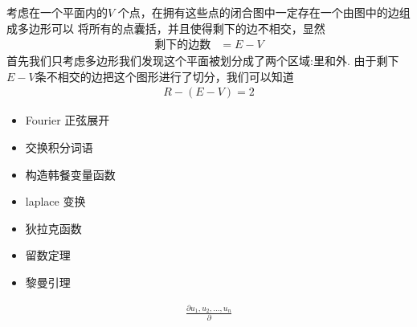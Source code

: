 \begin{thm}
考虑在一个平面内的$ V $ 个点，在拥有这些点的闭合图中一定存在一个由图中的边组成多边形可以
将所有的点囊括，并且使得剩下的边不相交，显然
\begin{align*}
		\text{剩下的边数}&= E-V 
\end{align*}
首先我们只考虑多边形我们发现这个平面被划分成了两个区域:里和外.
由于剩下$ E-V $条不相交的边把这个图形进行了切分，我们可以知道
 \begin{align*}
		R-(E-V) = 2
\end{align*}
\end{thm}
\begin{thm}[关于积分的菜谱]
		\begin{itemize}
				\item Fourier 正弦展开
				\item 交换积分词语
				\item 构造韩餐变量函数
				\item laplace 变换
				\item 狄拉克函数
				\item 留数定理
				\item 黎曼引理
		\end{itemize}
\end{thm}
\begin{thm}
		\begin{align*}
				\frac{\partial u_1,u_2,\ldots,u_n}{\partial } 
		\end{align*}
\end{thm}
\begin{thm}
		\begin{align*}

		\end{align*}
\end{thm}

\ifx\allfiles\undefined

\fi

